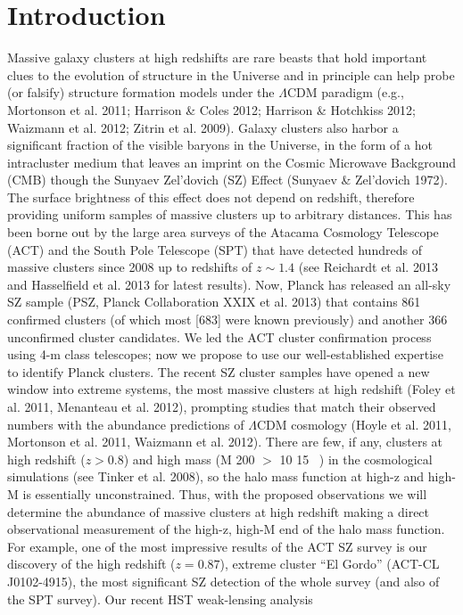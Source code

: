 \documentclass[apj, revtex4]{emulateapj}
\begin{document}
\section{Introduction}
Massive galaxy clusters at high redshifts are rare beasts that hold important clues to the evolution
of structure in the Universe and in principle can help probe (or falsify) structure formation models
under the $\Lambda$CDM paradigm (e.g., Mortonson et al. 2011; Harrison \& Coles 2012; Harrison \&
Hotchkiss 2012; Waizmann et al. 2012; Zitrin et al. 2009). Galaxy clusters also harbor a significant
fraction of the visible baryons in the Universe, in the form of a hot intracluster medium that
leaves an imprint on the Cosmic Microwave Background (CMB) though the Sunyaev Zel'dovich
(SZ) Effect (Sunyaev \& Zel’dovich 1972). The surface brightness of this effect does not depend on
redshift, therefore providing uniform samples of massive clusters up to arbitrary distances.
This has been borne out by the large area surveys of the Atacama Cosmology Telescope (ACT)
and the South Pole Telescope (SPT) that have detected hundreds of massive clusters since 2008
up to redshifts of $z \sim 1.4$ (see Reichardt et al. 2013 and Hasselfield et al. 2013 for latest results).
Now, Planck has released an all-sky SZ sample (PSZ, Planck Collaboration XXIX et al. 2013)
that contains 861 confirmed clusters (of which most [683] were known previously) and another
366 unconfirmed cluster candidates. We led the ACT cluster confirmation process using 4-m class
telescopes; now we propose to use our well-established expertise to identify Planck clusters.
The recent SZ cluster samples have opened a new window into extreme systems, the most massive
clusters at high redshift (Foley et al. 2011, Menanteau et al. 2012), prompting studies that match
their observed numbers with the abundance predictions of $\Lambda$CDM cosmology (Hoyle et al. 2011,
Mortonson et al. 2011, Waizmann et al. 2012). There are few, if any, clusters at high redshift
($z > 0.8$) and high mass (M 200 $>$ 10 15 \Msol\ ) in the cosmological simulations (see Tinker et al.
2008), so the halo mass function at high-z and high-M is essentially unconstrained. Thus, with
the proposed observations we will determine the abundance of massive clusters at high redshift
making a direct observational measurement of the high-z, high-M end of the halo mass function.
For example, one of the most impressive results of the ACT SZ survey is our discovery of the high
redshift ($z = 0.87$), extreme cluster “El Gordo” (ACT-CL J0102-4915), the most significant SZ
detection of the whole survey (and also of the SPT survey). Our recent HST weak-lensing analysis
\end{document}
